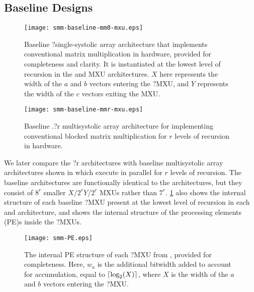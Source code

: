 \subsection{Baseline Designs}

\begin{figure}
  \centering
  \texttt{[image: smm-baseline-mm0-mxu.eps]}
  \caption{Baseline \mmArch?\zero single-systolic array architecture that implements conventional matrix multiplication  in hardware, provided for completeness and clarity.
    It is instantiated at the lowest level of recursion in the \smmArch and \mmArch MXU architectures.
    $X$ here represents the width of the $a$ and $b$ vectors entering the \mmArch?\zero MXU, and $Y$ represents the width of the $c$ vectors exiting the MXU.}
  \label{smm:fig:MM-mxu}
\end{figure}

\begin{figure}
  \centering
  \texttt{[image: smm-baseline-mmr-mxu.eps]}
  \caption{Baseline \sAlg.{\mm?r} multisystolic array architecture for implementing conventional blocked matrix multiplication  for $r$ levels of recursion in hardware.}
  \label{smm:fig:multi-mm-mxu}
\end{figure}

We later compare the \smmArch?r architectures with baseline \mmArch multisystolic array architectures shown in  which execute  in parallel for $r$ levels of recursion.
The baseline \mmArch architectures are functionally identical to the \smmArch architectures, but they consist of $8^r$ smaller $X/2^r$\by$Y/2^r$ MXUs rather than $7^r$.
\Figure \ref{smm:fig:MM-mxu} also shows the internal structure of each baseline \mmArch?\zero MXU present at the lowest level of recursion in each \smmArch and \mmArch architecture, and  shows the internal structure of the processing elements (PE)s inside the \mmArch?\zero MXUs.

\begin{figure}
  \centering
  \texttt{[image: smm-PE.eps]}
  \caption{The internal PE structure of each \mmArch?\zero MXU from , provided for completeness.
    Here, $w_a$ is the additional bitwidth added to account for accumulation, equal to $\lceil\text{log}_2(X)\rceil$, where $X$ is the width of the $a$ and $b$ vectors entering the \mmArch?\zero MXU.
  }
  \label{smm:fig:pes}
\end{figure}
